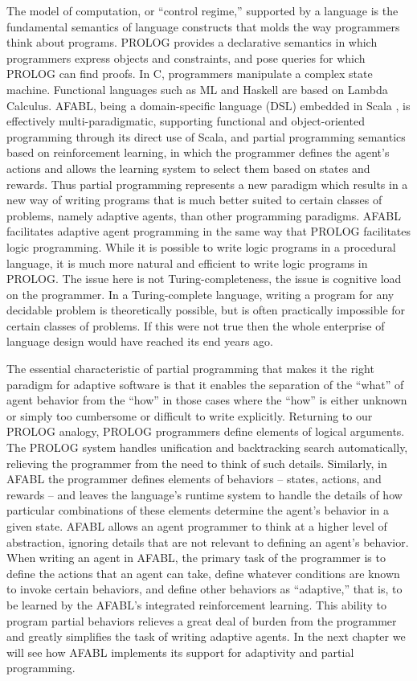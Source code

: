 The model of computation, or ``control regime,'' supported by a language is the fundamental semantics of language constructs that molds the way programmers think about programs. PROLOG provides a declarative semantics in which programmers express objects and constraints, and pose queries for which PROLOG can find proofs.  In C, programmers manipulate a complex state machine. Functional languages such as ML and Haskell are based on Lambda Calculus. AFABL, being a domain-specific language (DSL) \cite{hudak1996building} embedded in Scala \cite{odersky2008programming,odersky2005scalable}, is effectively multi-paradigmatic, supporting functional and object-oriented programming through its direct use of Scala, and partial programming semantics based on reinforcement learning, in which the programmer defines the agent's actions and allows the learning system to select them based on states and rewards.  Thus partial programming represents a new paradigm which results in a new way of writing programs that is much better suited to certain classes of problems, namely adaptive agents, than other programming paradigms.  AFABL facilitates adaptive agent programming in the same way that PROLOG facilitates logic programming.  While it is possible to write logic programs in a procedural language, it is much more natural and efficient to write logic programs in PROLOG.  The issue here is not Turing-completeness, the issue is cognitive load on the programmer.  In a Turing-complete language, writing a program for any decidable problem is theoretically possible, but is often practically impossible for certain classes of problems.  If this were not true then the whole enterprise of language design would have reached its end years ago.

The essential characteristic of partial programming that makes it the right paradigm for adaptive software is that it enables the separation of the ``what'' of agent behavior from the ``how'' in those cases where the ``how'' is either unknown or simply too cumbersome or difficult to write explicitly.  Returning to our PROLOG analogy, PROLOG programmers define elements of logical arguments.  The PROLOG system handles unification and backtracking search automatically, relieving the programmer from the need to think of such details. Similarly, in AFABL the programmer defines elements of behaviors -- states, actions, and rewards -- and leaves the language's runtime system to handle the details of how particular combinations of these elements determine the agent's behavior in a given state.  AFABL allows an agent programmer to think at a higher level of abstraction, ignoring details that are not relevant to defining an agent's behavior.  When writing an agent in AFABL, the primary task of the programmer is to define the actions that an agent can take, define whatever conditions are known to invoke certain behaviors, and define other behaviors as ``adaptive,'' that is, to be learned by the AFABL's integrated reinforcement learning.  This ability to program partial behaviors relieves a great deal of burden from the programmer and greatly simplifies the task of writing adaptive agents.  In the next chapter we will see how AFABL implements its support for adaptivity and partial programming.

